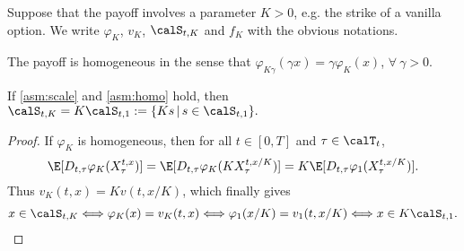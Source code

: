
Suppose that the payoff involves a parameter $K>0$, e.g. the strike of a vanilla option.  We write $\varphi_K$, $v_K$, $\calS_{t,K}$ and $f_K$ with the obvious notations. 
\begin{asm} \label{asm:homo}
The payoff is homogeneous in the sense that $\varphi_{K\gamma}(\gamma x)=\gamma \varphi_{K}(x)$, $\forall \  \gamma>0$. 
\end{asm}

\begin{proposition}\label{lem:homogen}
If  \cref{asm:scale} and \ref{asm:homo} hold,
then 
$\calS_{t,K}=K\calS_{t,1}:= \{Ks \,|\, s \in \calS_{t,1}\}.$
\end{proposition}
\begin{proof}
If $\varphi_K$ is homogeneous, then for all $t\in [0,T]$ and $\tau \in \calT_t$,
$$ \E[D_{t,\tau}\varphi_K(X^{t,x}_{\tau})] = \E[D_{t,\tau}\varphi_K(K X^{t,x/K}_{\tau})] =  K \E[D_{t,\tau} \varphi_1(X^{t,x/K}_{\tau})].$$
Thus $v_K(t,x) = K v(t,x/K)$, which finally gives 
\begin{align*}
    x \in \calS_{t,K} \Longleftrightarrow \varphi_K(x) = v_K(t,x)
    \Longleftrightarrow \varphi_1(x/K) = v_1(t,x/K)
    \Longleftrightarrow x \in K\calS_{t,1}.
\end{align*}
\end{proof}





